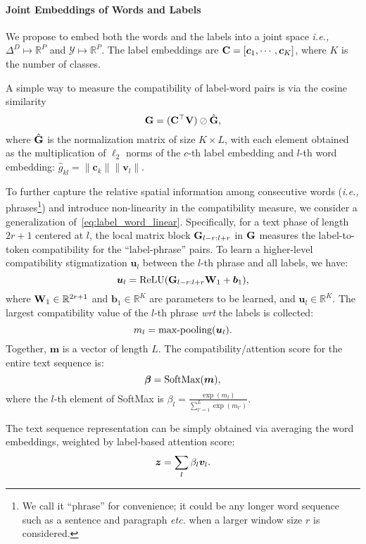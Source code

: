 \documentclass[11pt,a4paper]{article}
\newcommand{\ie}[0]{\emph{i.e., }}
\newcommand{\etc}[0]{\emph{etc. }}
\newcommand{\wrt}[0]{\emph{wrt }}
\newcommand{\beq}{\vspace{0mm}\begin{equation}}
\newcommand{\eeq}{\vspace{0mm}\end{equation}}
\newcommand{\Cmat}{{\bf C}}
\newcommand{\Gmat}{{\bf G}}
\newcommand{\Vmat}[0]{{{\bf V}}}
\newcommand{\Wmat}[0]{{{\bf W}}}
\newcommand{\bv}[0]{{\boldsymbol{b}}}
\newcommand{\cv}[0]{{\boldsymbol{c}}}
\newcommand{\mv}[0]{{\boldsymbol{m}}}
\newcommand{\uv}{\boldsymbol{u}}
\newcommand{\vv}{\boldsymbol{v}}
\newcommand{\zv}{\boldsymbol{z}}
\newcommand{\betav}[0]{{\boldsymbol{\beta}}}
\newcommand{\R}{\mathbb{R}}
\newcommand{\Ycal}{\mathcal{Y}}
\begin{document}
\paragraph{Joint Embeddings of Words and Labels}
We propose to embed both the words and the labels into a joint space \ie $\Delta^D \mapsto \R^P$ and  $\Ycal  \mapsto \R^P$. The label embeddings are $\Cmat = [\cv_1, \cdots, \cv_K ]$, where $K$ is the number of classes.

A simple way to measure the compatibility of label-word pairs is via the cosine similarity
\beq
\Gmat = (\Cmat^{\top} \Vmat)  \oslash  \hat{\Gmat},
\label{eq:label_word_linear}
\eeq	
where $\hat{\Gmat}$ is the normalization matrix of size $K \times L$, with each element obtained as the multiplication of $\ell_2$ norms of the $c$-th label embedding and $l$-th word embedding: $\hat{g}_{kl} =\| \cv_k \| \| \vv_l \|$.




To further capture the relative spatial information among consecutive words (\ie phrases\footnote{We call it ``phrase'' for convenience; it could be any longer word sequence such as a sentence and paragraph \etc when a larger window size $r$ is considered.}) and introduce non-linearity in the compatibility measure, we consider a generalization of~\eqref{eq:label_word_linear}. Specifically, for a text phase of length $2r+1$ centered at $l$, the local matrix block $\Gmat_{l-r:l+r}$ in $\Gmat$ measures the label-to-token compatibility for the ``label-phrase'' pairs. To learn a higher-level compatibility stigmatization $\uv_{l}$ between the $l$-th phrase and all labels, we have:
\beq{
	\uv_{l} = \mbox{ReLU}(  \Gmat_{l-r:l+r}  \Wmat_1 + \bv_1),
	\label{eq:label_word_nonlinear}
}\eeq
where $\Wmat_1 \in \R^{ 2r+1 }$ and $\bv_1 \in \R^{ K }$ are parameters to be learned, and $\uv_l\in\mathbb{R}^K$.
The largest compatibility value of the $l$-th phrase \wrt the labels is collected:
\beq{
	m_l =  \mbox{max-pooling}(\uv_{l}).
}\eeq
Together, $\mv$ is a vector of length $L$. 
The compatibility/attention score for the entire text sequence is:
\beq{
	\betav = \mbox{SoftMax}(\mv),
}\eeq
where the $l$-th element of SoftMax is $\beta_l = \frac{\exp(m_l)}{\sum_{l'=1}^L \exp(m_{l'}) }$.


The text sequence representation can be simply obtained via averaging the word embeddings, weighted by label-based attention score:
\beq{
	\zv = \sum_l \beta_l  \vv_l.
	\label{eq:text_vector}
}\eeq 
\end{document}
